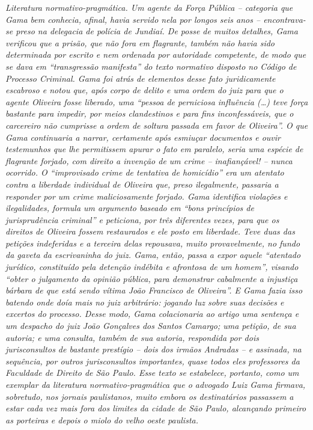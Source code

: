\begin{didascalia}
\emph{Literatura normativo-pragmática. Um agente da Força Pública --
categoria que Gama bem conhecia, afinal, havia servido nela por longos
seis anos -- encontrava-se preso na delegacia de polícia de Jundiaí. De
posse de muitos detalhes, Gama verificou que a prisão, que não fora em
flagrante, também não havia sido determinada por escrito e nem ordenada
por autoridade competente, de modo que se dava em ``transgressão
manifesta'' do texto normativo disposto no Código de Processo Criminal.
Gama foi atrás de elementos desse fato juridicamente escabroso e notou
que, após corpo de delito e uma ordem do juiz para que o agente Oliveira
fosse liberado, uma ``pessoa de perniciosa influência (\ldots{}) teve força
bastante para impedir, por meios clandestinos e para fins
inconfessáveis, que o carcereiro não cumprisse a ordem de soltura
passada em favor de Oliveira''. O que Gama continuaria a narrar,
certamente após esmiuçar documentos e ouvir testemunhos que lhe
permitissem apurar o fato em paralelo, seria uma espécie de flagrante
forjado, com direito a invenção de um crime -- inafiançável! -- nunca
ocorrido. O ``improvisado crime de tentativa de homicídio'' era um
atentato contra a liberdade individual de Oliveira que, preso
ilegalmente, passaria a responder por um crime maliciosamente forjado.
Gama identifica violações e ilegalidades, formula um argumento baseado
em ``bons princípios de jurisprudência criminal'' e peticiona, por três
diferentes vezes, para que os direitos de Oliveira fossem restaurados e
ele posto em liberdade. Teve duas das petições indeferidas e a terceira
delas repousava, muito provavelmente, no fundo da gaveta da escrivaninha
do juiz. Gama, então, passa a expor aquele ``atentado jurídico,
constituído pela detenção indébita e afrontosa de um homem'', visando
``obter o julgamento da opinião pública, para demonstrar cabalmente a
injustiça bárbara de que está sendo vítima João Francisco de Oliveira''.
E Gama fazia isso batendo onde doía mais no juiz arbitrário: jogando luz
sobre suas decisões e excertos do processo. Desse modo, Gama
colacionaria ao artigo uma sentença e um despacho do juiz João Gonçalves
dos Santos Camargo; uma petição, de sua autoria; e uma consulta, também
de sua autoria, respondida por dois jurisconsultos de bastante prestígio
-- dois dos irmãos Andradas -- e assinada, na sequência, por outros
jurisconsultos importantes, quase todos eles professores da Faculdade de
Direito de São Paulo. Esse texto se estabelece, portanto, como um
exemplar da literatura normativo-pragmática que o advogado Luiz Gama
firmava, sobretudo, nos jornais paulistanos, muito embora os
destinatários passassem a estar cada vez mais fora dos limites da cidade
de São Paulo, alcançando primeiro as porteiras e depois o miolo do velho
oeste paulista.}
\end{didascalia}


